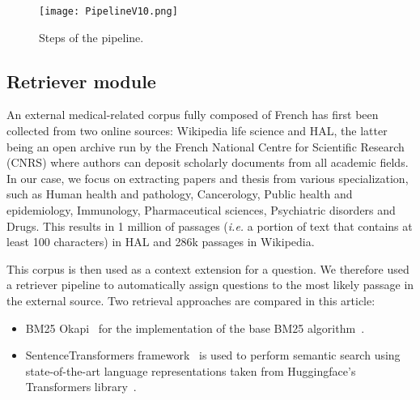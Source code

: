 \documentclass[11pt]{article}
\begin{document}
\begin{figure}[htb!]
\centering
\texttt{[image: PipelineV10.png]}
\caption{Steps of the pipeline.}
\label{fig:Pipeline}
\end{figure}


\subsection{Retriever module}
\label{s:retriever}

An external medical-related corpus fully composed of French has first been collected from two online sources: Wikipedia life science and HAL, the latter being an open archive run by the French National Centre for Scientific Research (CNRS) where authors can deposit scholarly documents from all academic fields. In our case, we focus on extracting papers and thesis from various specialization, such as Human health and pathology, Cancerology, Public health and epidemiology, Immunology, Pharmaceutical sciences, Psychiatric disorders and Drugs. This results in 1 million of passages ({\it i.e.} a portion of text that contains at least 100 characters) in HAL and 286k passages in Wikipedia.



This corpus is then used as a context extension for a question. We therefore used a retriever pipeline to automatically assign questions to the most likely passage in the external source. Two retrieval approaches are compared in this article: 

\begin{itemize}
\item BM25 Okapi~\cite{10.1145/2682862.2682863} for the implementation of the base BM25 algorithm~\cite{10.5555/106765.106783}.
\item SentenceTransformers framework~\cite{https://doi.org/10.48550/arxiv.1908.10084} is used to perform semantic search using state-of-the-art language representations taken from Huggingface’s Transformers library~\cite{https://doi.org/10.48550/arxiv.1910.03771}.
\end{itemize}
\end{document}
